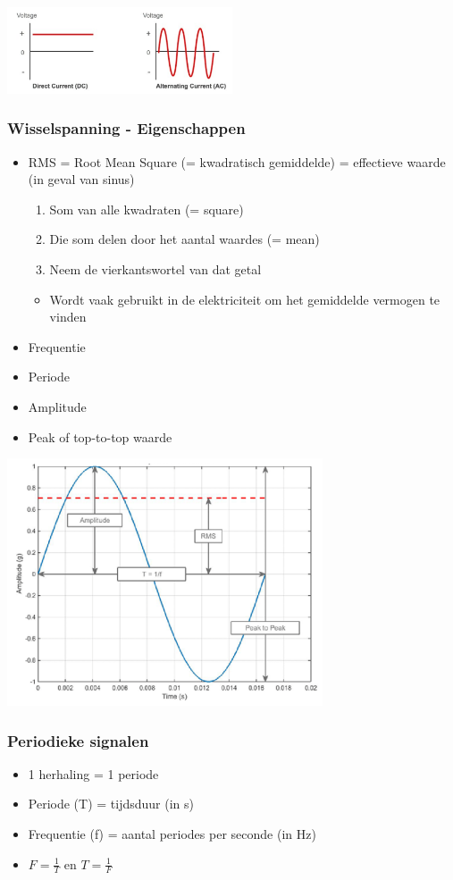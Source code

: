\documentclass{article}
\begin{document}
\includegraphics[width=0.5\textwidth]{Screenshot_20200217_121011.png}

\subsubsection{Wisselspanning - Eigenschappen}
\begin{itemize}
    \item RMS = Root Mean Square (= kwadratisch gemiddelde) = effectieve waarde (in geval van sinus)
    \begin{enumerate}
        \item Som van alle kwadraten (= square)
        \item Die som delen door het aantal waardes (= mean)
        \item Neem de vierkantswortel van dat getal
    \end{enumerate}
    \begin{itemize}
        \item Wordt vaak gebruikt in de elektriciteit om het gemiddelde vermogen te vinden
    \end{itemize}
    \item Frequentie
    \item Periode
    \item Amplitude
    \item Peak of top-to-top waarde
\end{itemize}
\includegraphics[width=0.7\textwidth]{Screenshot_20200217_121136.png}

\subsubsection{Periodieke signalen}
\begin{itemize}
    \item 1 herhaling = 1 periode
    \item Periode (T) = tijdsduur (in s)
    \item Frequentie (f) = aantal periodes per seconde (in Hz)
    \item $F = \frac1T$ en $T = \frac1F$
\end{itemize}
\end{document}
